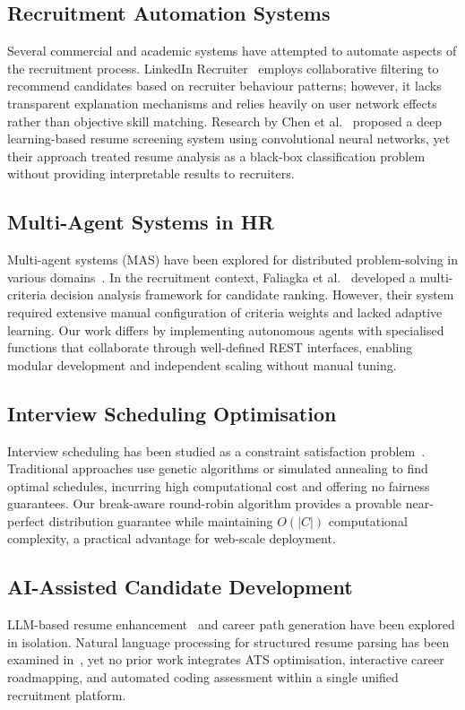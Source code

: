 \documentclass[conference]{IEEEtran}
\begin{document}
\subsection{Recruitment Automation Systems}
Several commercial and academic systems have attempted to automate aspects of the recruitment process. LinkedIn Recruiter~\cite{b4} employs collaborative filtering to recommend candidates based on recruiter behaviour patterns; however, it lacks transparent explanation mechanisms and relies heavily on user network effects rather than objective skill matching. Research by Chen et al.~\cite{b5} proposed a deep learning-based resume screening system using convolutional neural networks, yet their approach treated resume analysis as a black-box classification problem without providing interpretable results to recruiters.

\subsection{Multi-Agent Systems in HR}
Multi-agent systems (MAS) have been explored for distributed problem-solving in various domains~\cite{b6}. In the recruitment context, Faliagka et al.~\cite{b7} developed a multi-criteria decision analysis framework for candidate ranking. However, their system required extensive manual configuration of criteria weights and lacked adaptive learning. Our work differs by implementing autonomous agents with specialised functions that collaborate through well-defined REST interfaces, enabling modular development and independent scaling without manual tuning.

\subsection{Interview Scheduling Optimisation}
Interview scheduling has been studied as a constraint satisfaction problem~\cite{b8}. Traditional approaches use genetic algorithms or simulated annealing to find optimal schedules, incurring high computational cost and offering no fairness guarantees. Our break-aware round-robin algorithm provides a provable near-perfect distribution guarantee while maintaining $O(|C|)$ computational complexity, a practical advantage for web-scale deployment.

\subsection{AI-Assisted Candidate Development}
LLM-based resume enhancement~\cite{b9,b10} and career path generation have been explored in isolation. Natural language processing for structured resume parsing has been examined in~\cite{b11}, yet no prior work integrates ATS optimisation, interactive career roadmapping, and automated coding assessment within a single unified recruitment platform.
\end{document}
